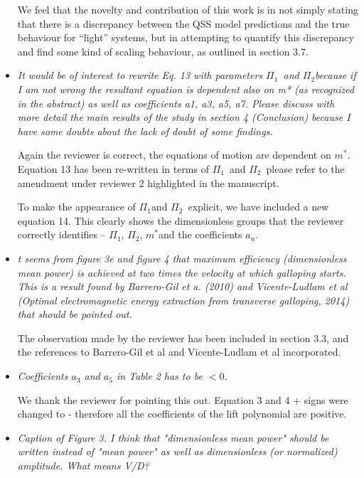 \documentclass[]{article}
\newcommand{\mstar}{\ensuremath{m^{*}}}
\newcommand{\massstiff}{\ensuremath{\Pi_1}}
\newcommand{\massdamp}{\ensuremath{\Pi_2}}
\begin{document}
\begin{itemize}
We feel that the novelty and contribution of this work is in not simply stating that there is a discrepancy between the QSS model predictions and the true behaviour for ``light'' systems, but in attempting to quantify this discrepancy and find some kind of scaling behaviour, as outlined in section 3.7.
	
\item \emph{It would be of interest to rewrite Eq. 13 with parameters \massstiff \ and \massdamp because if I am not wrong the resultant equation is dependent also on m* (as recognized in the abstract) as well as coefficients a1, a3, a5, a7. Please discuss with more detail the main results of the study in section 4 (Conclusion) because I have some doubts about the lack of doubt of some findings.}
	
Again the reviewer is correct, the equations of motion are dependent on $m^*$. Equation 13 has been re-written in terms of \massstiff \ and \massdamp \ please refer to the amendment under reviewer 2 highlighted in the manuscript.

To make the appearance of \massstiff and \massdamp \ explicit, we have included a new equation 14. This clearly shows the dimensionless groups that the reviewer correctly identifies – \massstiff, \massdamp, \mstar and the coefficients $a_n$.

\item \emph{t seems from figure 3e and figure 4 that maximum efficiency (dimensionless mean power) is achieved at two times the velocity at which galloping starts. This is a result found by Barrero-Gil et a. (2010) and Vicente-Ludlam et al (Optimal electromagnetic energy extraction from transverse galloping, 2014) that should be pointed out.}

The observation made by the reviewer has been included in section 3.3, and the references to Barrero-Gil et al and Vicente-Ludlam et al incorporated.

\item \emph{Coefficients $a_3$  and $a_5$ in Table 2 has to be $<0$.}

We thank the reviewer for pointing this out. Equation 3 and 4 {+} signs were changed to {-} therefore all the coefficients of the lift polynomial are positive.
 
\item \emph{Caption of Figure 3. I think that "dimensionless mean power" should be written instead of "mean power" as well as dimensionless (or normalized) amplitude. What means V/D?}


\end{itemize}
\end{document}
